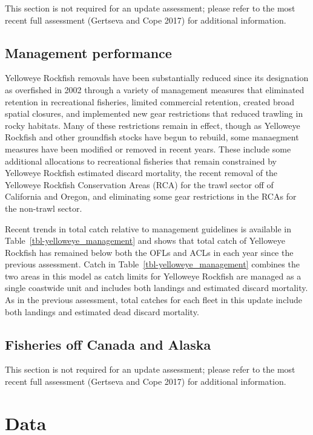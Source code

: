 \documentclass[
]{scrartcl}
\begin{document}
This section is not required for an update assessment; please refer to
the most recent full assessment (Gertseva and Cope 2017) for additional
information.

\subsection{Management performance}\label{management-performance-1}

Yelloweye Rockfish removals have been substantially reduced since its
designation as overfished in 2002 through a variety of management
measures that eliminated retention in recreational fisheries, limited
commercial retention, created broad spatial closures, and implemented
new gear restrictions that reduced trawling in rocky habitats. Many of
these restrictions remain in effect, though as Yelloweye Rockfish and
other groundfish stocks have begun to rebuild, some manaegment measures
have been modified or removed in recent years. These include some
additional allocations to recreational fisheries that remain constrained
by Yelloweye Rockfish estimated discard mortality, the recent removal of
the Yelloweye Rockfish Conservation Areas (RCA) for the trawl sector off
of California and Oregon, and eliminating some gear restrictions in the
RCAs for the non-trawl sector.

Recent trends in total catch relative to management guidelines is
available in Table~\ref{tbl-yelloweye_management} and shows that total
catch of Yelloweye Rockfish has remained below both the OFLs and ACLs in
each year since the previous assessment. Catch in
Table~\ref{tbl-yelloweye_management} combines the two areas in this
model as catch limits for Yelloweye Rockfish are managed as a single
coastwide unit and includes both landings and estimated discard
mortality. As in the previous assessment, total catches for each fleet
in this update include both landings and estimated dead discard
mortality.

\subsection{Fisheries off Canada and
Alaska}\label{fisheries-off-canada-and-alaska}

This section is not required for an update assessment; please refer to
the most recent full assessment (Gertseva and Cope 2017) for additional
information.

\newpage{}

\section{Data}\label{data}
\end{document}
